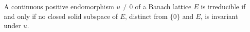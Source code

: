 A continuous positive endomorphism $u \neq 0$ of a Banach lattice $E$ is irreducible if and only if no closed solid subspace of $E$, distinct from $\{0\}$ and $E$, is invariant under $u$.

